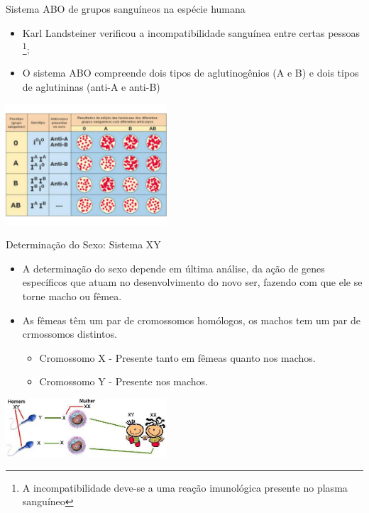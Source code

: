 \documentclass[]{beamer}
\begin{document}
  \begin{frame}{Sistema ABO de grupos sanguíneos na espécie humana}
    \begin{center}
      \begin{multicols}{2}
        \begin{itemize}
          \item Karl Landsteiner verificou a incompatibilidade sanguínea entre certas pessoas
            \footnote{
              A incompatibilidade deve-se a uma reação imunológica presente no plasma sanguíneo
            };
          \item O sistema ABO compreende dois tipos de aglutinogênios (A e B) e dois tipos de aglutininas (anti-A e anti-B)
        \end{itemize}

        \columnbreak
        \includegraphics[width=6cm]{images/abo.png}
      \end{multicols}
    \end{center}
  \end{frame}

  \begin{frame}{Determinação do Sexo: Sistema XY}
    \begin{center}
      \begin{itemize}
        \item A determinação do sexo depende em última análise, da ação de genes específicos que atuam no desenvolvimento do novo ser, fazendo com que ele se torne macho ou fêmea.
        \item As fêmeas têm um par de cromossomos homólogos, os machos tem um par de crmossomos distintos.
        \begin{itemize}
          \item Cromossomo X - Presente tanto em fêmeas quanto nos machos.
          \item Cromossomo Y - Presente nos machos.
        \end{itemize}
      \end{itemize}

      \hspace{0.5cm}

      \includegraphics[width=6cm]{images/xy.png}
    \end{center}
  \end{frame}

  \begin{frame}
    \begin{center}
      \nocite{*}
      
      
    \end{center}
  \end{frame}
\end{document}
